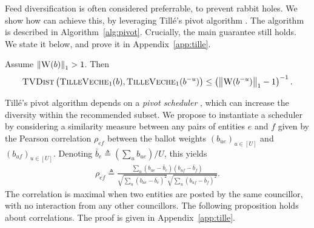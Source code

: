 Feed diversification is often considered preferrable, to prevent rabbit holes.
We show how \Veche{} can achieve 
this, by leveraging Tillé's pivot algorithm \CITE{}.
The algorithm is described in Algorithm~\ref{alg:pivot}.
Crucially, the main guarantee still holds.
We state it below, and prove it in Appendix~\ref{app:tille}.

\begin{theorem} \label{th:tille}
    Assume $\left\lVert{\textsc{W}(b)}\right\rVert_{1} > 1$.
    Then
    \begin{align}
        \textsc{TVDist} \left( 
            \textsc{TilleVeche}_1(b), 
            \textsc{TilleVeche}_1(b^{-u})
        \right) 
        \leq \left( \left\lVert{\textsc{W}(b^{-u})}\right\rVert_{1} - 1 \right)^{-1}.
    \end{align}
\end{theorem}

Tillé's pivot algorithm depends on a \emph{pivot scheduler} \Scheduler,
which can increase the diversity within the recommended subset.
We propose to instantiate a scheduler 
by considering a similarity measure between any pairs of entities $e$ and $f$
given by the Pearson correlation $\rho_{ef}$
between the ballot weights $(b_{ue})_{u \in [U]}$ and $(b_{uf})_{u \in [U]}$.
Denoting $\bar b_e \triangleq (\sum_u b_{ue}) / U$, this yields
\begin{align}
    \rho_{ef} \triangleq \frac{
        \sum_u (b_{ue} - \bar b_e) (b_{uf} - \bar b_f)
    }{
        \sqrt{\sum_u (b_{ue} - \bar b_e)^2}
        \sqrt{\sum_u (b_{uf} - \bar b_f)^2}
    }.
\end{align}
The correlation is maximal when two entities are posted by the same councillor,
with no interaction from any other councillors.
The following proposition holds about correlations.
The proof is given in Appendix~\ref{app:tille}.

